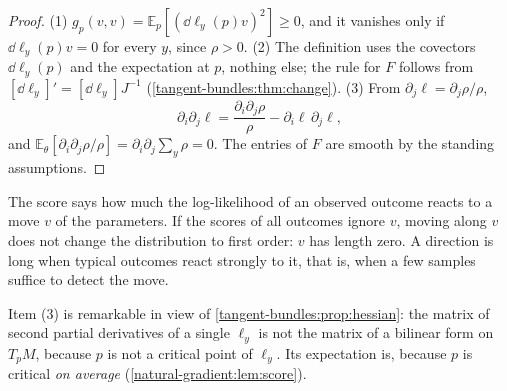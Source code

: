\begin{notechapter}
\begin{proof}
(1) $g_p(v, v) = \mathbb E_p[(\dd\ell_y(p)v)^2]\geq0$, and it vanishes
only if $\dd\ell_y(p)v = 0$ for every $y$, since $\rho > 0$. (2) The
definition uses the covectors $\dd\ell_y(p)$ and the expectation at $p$,
nothing else; the rule for $F$ follows from
$[\dd\ell_y]' = [\dd\ell_y]J^{-1}$ (\cref{tangent-bundles:thm:change}).
(3) From $\partial_j\ell = \partial_j\rho/\rho$,
\[
  \partial_i\partial_j\ell
  = \frac{\partial_i\partial_j\rho}\rho
  - \partial_i\ell\,\partial_j\ell ,
\]
and
$\mathbb E_\theta[\partial_i\partial_j\rho/\rho]
= \partial_i\partial_j\sum_y\rho = 0$. The entries of $F$ are smooth by
the standing assumptions.
\end{proof}

\begin{intuition}
The score says how much the log-likelihood of an observed outcome reacts
to a move $v$ of the parameters. If the scores of all outcomes ignore
$v$, moving along $v$ does not change the distribution to first order:
$v$ has length zero. A direction is long when typical outcomes react
strongly to it, that is, when a few samples suffice to detect the move.
\end{intuition}

Item (3) is remarkable in view of \cref{tangent-bundles:prop:hessian}:
the matrix of second partial derivatives of a single $\ell_y$ is not the
matrix of a bilinear form on $T_pM$, because $p$ is not a critical point
of $\ell_y$. Its expectation is, because $p$ is critical \emph{on
average} (\cref{natural-gradient:lem:score}).


\end{notechapter}
